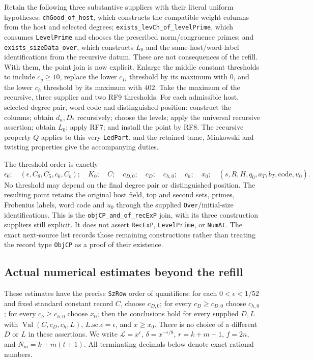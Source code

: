 \documentclass[11pt,a4paper]{article}
\numberwithin{equation}{section}
\theoremstyle{remark}\newtheorem{remark}[theorem]{Remark}
\begin{document}
Retain the following three substantive suppliers with their literal
uniform hypotheses: \texttt{chGood\_\allowbreak of\_\allowbreak host}, which constructs the
compatible weight columns from the host and selected degrees;
\texttt{exists\_\allowbreak levCh\_\allowbreak of\_\allowbreak levelPrime}, which consumes
\texttt{LevelPrime} and chooses the prescribed norm/congruence primes;
and \texttt{exists\_\allowbreak sizeData\_\allowbreak over}, which constructs $L_0$ and the
same-host/word-label identifications from the recursive datum. These
are not consequences of the refill. With them, the point join is now
explicit. Enlarge the middle constant thresholds to include $c_g\geq10$,
replace the lower $c_D$ threshold by its maximum with $0$, and the lower
$c_h$ threshold by its maximum with $402$. Take the maximum of the
recursive, three supplier and two RF9 thresholds. For each admissible
host, selected degree pair, word code and distinguished position:
construct the columns; obtain $d_u,D_*$ recursively; choose the levels;
apply the universal recursive assertion; obtain $L_0$; apply RF7; and
install the point by RF8. The recursive property $Q$ applies to this
very \texttt{LedPart}, and the retained tame, Minkowski and twisting
properties give the accompanying duties.

The threshold order is exactly
\[
 \epsilon_0;\quad(\epsilon,C_8,C_5,c_6,C_b);\quad K_0;\quad C;
 \quad c_{D,0};\quad c_D;\quad c_{h,0};\quad c_h;\quad x_0;
 \quad(s,R,H,q_0,a_T,b_T,\mathrm{code},u_0).                    \tag{RF.23}
\]
No threshold may depend on the final degree pair or distinguished
position. The resulting point retains the original host field, top and
second sets, primes, Frobenius labels, word code and $u_0$ through the
supplied \texttt{Over}/initial-size identifications. This is the
\texttt{objCP\_\allowbreak and\_\allowbreak of\_\allowbreak recExP} join, with its three construction
suppliers still explicit. It does not assert \texttt{RecExP},
\texttt{LevelPrime}, or \texttt{NumAt}. The exact next-source list
records those remaining constructions rather than treating the record
type \texttt{ObjCP} as a proof of their existence.

\subsection{Actual numerical estimates beyond the refill}

These estimates have the precise \texttt{SzRow} order of quantifiers:
for each $0<\epsilon<1/52$ and fixed standard constant record $C$, choose
$c_{D,0}$; for every $c_D\geq c_{D,0}$ choose $c_{h,0}$; for every
$c_h\geq c_{h,0}$ choose $x_0$; then the conclusions hold for every
supplied $D,L$ with $\operatorname{Val}(C,c_D,c_h,L)$,
$L.\mathrm{sc}.\epsilon=\epsilon$, and $x\geq x_0$.
There is no choice of a different $D$ or $L$ in these assertions.
We write $\mathcal L=x^\epsilon$, $\delta=x^{-\epsilon/8}$,
$r=k+m-1$, $f=2n$, and $N_m=k+m(t+1)$.
All terminating decimals below denote exact rational numbers.
\end{document}

